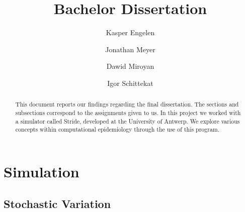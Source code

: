 \documentclass[runningheads]{llncs}
\begin{document}
%
\title{Bachelor Dissertation}
%
%
\author{Kasper Engelen\and
		Jonathan Meyer\and
		Dawid Miroyan\and
		Igor Schittekat}
%
%
%
\maketitle              %
%
\begin{abstract}
This document reports our findings regarding the final dissertation. The sections and subsections correspond to the assignments given to us. In this project we worked with a simulator called Stride, developed at the University of Antwerp. We explore various concepts within computational epidemiology through the use of this program. 

\end{abstract}
%
%
%
\section{Simulation}
\subsection{Stochastic Variation}
\end{document}
